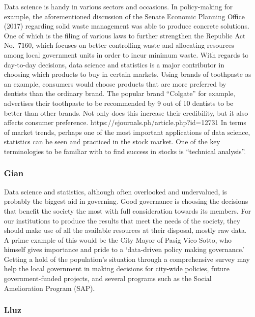 \documentclass[
]{article}
\begin{document}
Data science is handy in various sectors and occasions. In policy-making
for example, the aforementioned discussion of the Senate Economic
Planning Office (2017) regarding solid waste management was able to
produce concrete solutions. One of which is the filing of various laws
to further strengthen the Republic Act No.~7160, which focuses on better
controlling waste and allocating resources among local government units
in order to incur minimum waste. With regards to day-to-day decisions,
data science and statistics is a major contributor in choosing which
products to buy in certain markets. Using brands of toothpaste as an
example, consumers would choose products that are more preferred by
dentists than the ordinary brand. The popular brand ``Colgate'' for
example, advertises their toothpaste to be recommended by 9 out of 10
dentists to be better than other brands. Not only does this increase
their credibility, but it also affects consumer preference.
https://ejournals.ph/article.php?id=12731 In terms of market trends,
perhaps one of the most important applications of data science,
statistics can be seen and practiced in the stock market. One of the key
terminologies to be familiar with to find success in stocks is
``technical analysis''.

\hypertarget{gian-1}{%
\subsubsection{Gian}\label{gian-1}}

Data science and statistics, although often overlooked and undervalued,
is probably the biggest aid in governing. Good governance is choosing
the decisions that benefit the society the most with full consideration
towards its members. For our institutions to produce the results that
meet the needs of the society, they should make use of all the available
resources at their disposal, mostly raw data. A prime example of this
would be the City Mayor of Pasig Vico Sotto, who himself gives
importance and pride to a `data-driven policy making governance.'
Getting a hold of the population's situation through a comprehensive
survey may help the local government in making decisions for city-wide
policies, future government-funded projects, and several programs such
as the Social Amelioration Program (SAP).

\hypertarget{lluz-1}{%
\subsubsection{Lluz}\label{lluz-1}}
\end{document}
